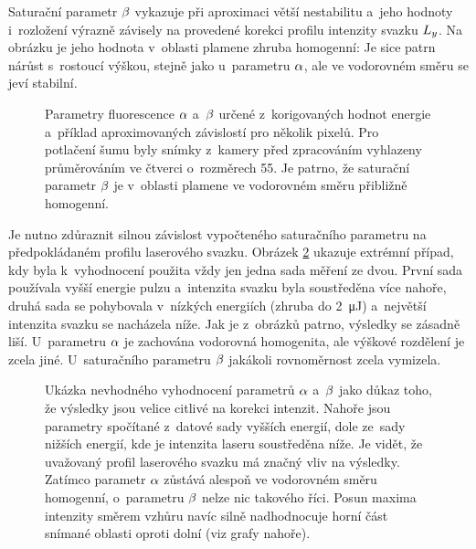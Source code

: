 Saturační parametr $\beta$ vykazuje při aproximaci větší nestabilitu
a~jeho hodnoty i~rozložení výrazně závisely na provedené korekci profilu
intenzity svazku $L_y$.
Na obrázku je jeho hodnota v~oblasti plamene zhruba homogenní:
Je sice patrn nárůst s~rostoucí výškou, stejně jako u~parametru $\alpha$,
ale ve vodorovném směru se jeví stabilní.

\begin{figure}[p]
	\centering
	\small
	
	\caption{Parametry fluorescence $\alpha$ a~$\beta$
		určené z~korigovaných hodnot energie
		a~příklad aproximovaných závislostí pro několik pixelů.
		Pro potlačení šumu byly snímky z~kamery před zpracováním vyhlazeny
		průměrováním ve čtverci o~rozměrech \num{5}\times\SI{5}{\pixel}.
		Je patrno, že saturační parametr $\beta$ je
		v~oblasti plamene ve vodorovném směru přibližně homogenní.}
	\label{fig:lif-saturation-full-params}
\end{figure}

Je nutno zdůraznit silnou závislost vypočteného saturačního parametru
na předpokládaném profilu laserového svazku.
Obrázek \ref{fig:lif-saturation-full-params-bad} ukazuje extrémní případ,
kdy byla k~vyhodnocení použita vždy jen jedna sada měření ze dvou.
První sada používala vyšší energie pulzu a~intenzita svazku byla soustředěna
více nahoře, druhá sada se pohybovala v~nízkých energiích
(zhruba do \SI{2}{\micro\joule}) a~největší intenzita svazku se nacházela níže.
Jak je z~obrázků patrno, výsledky se zásadně liší.
U~parametru $\alpha$ je zachována vodorovná homogenita,
ale výškové rozdělení je zcela jiné.
U~saturačního parametru $\beta$ jakákoli rovnoměrnost zcela vymizela.

\begin{figure}[htbp]
	\centering
	\small
	
	\caption{Ukázka nevhodného vyhodnocení parametrů $\alpha$ a~$\beta$
		jako důkaz toho, že výsledky jsou velice citlivé na korekci intenzit.
		Nahoře jsou parametry spočítané z~datové sady vyšších energií,
		dole ze~sady nižších energií, kde je intenzita laseru soustředěna níže.
		Je vidět, že uvažovaný profil laserového svazku má značný vliv
		na výsledky.
		Zatímco parametr $\alpha$ zůstává alespoň ve vodorovném směru
		homogenní, o~parametru $\beta$ nelze nic takového říci.
		Posun maxima intenzity směrem vzhůru navíc silně nadhodnocuje
		horní část snímané oblasti oproti dolní (viz grafy nahoře).}
	\label{fig:lif-saturation-full-params-bad}
\end{figure}

